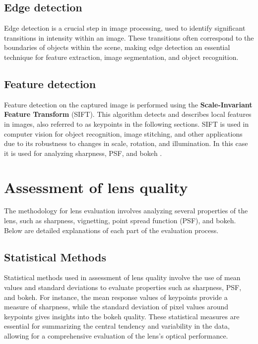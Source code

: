 \subsection{Edge detection}

Edge detection is a crucial step in image processing, used to identify significant transitions in intensity within an image. These transitions often correspond to the boundaries of objects within the scene, making edge detection an essential technique for feature extraction, image segmentation, and object recognition.


\subsection{Feature detection}
Feature detection on the captured image is performed using the \textbf{Scale-Invariant Feature Transform} (SIFT). This algorithm detects and describes local features in images, also referred to as keypoints in the following sections. SIFT is used in computer vision for object recognition, image stitching, and other applications due to its robustness to changes in scale, rotation, and illumination. In this case it is used for analyzing sharpness, PSF, and bokeh \cite{Sift}.

\section{Assessment of lens quality}

The methodology for lens evaluation involves analyzing several properties of the lens, such as sharpness, vignetting, point spread function (PSF), and bokeh. Below are detailed explanations of each part of the evaluation process.

\subsection{Statistical Methods}

Statistical methods used in assessment of lens quality involve the use of mean values and standard deviations to evaluate properties such as sharpness, PSF, and bokeh. For instance, the mean response values of keypoints provide a measure of sharpness, while the standard deviation of pixel values around keypoints gives insights into the bokeh quality. These statistical measures are essential for summarizing the central tendency and variability in the data, allowing for a comprehensive evaluation of the lens's optical performance.

